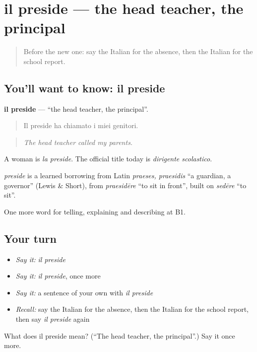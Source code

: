 \section[il preside]{il preside — the head teacher, the principal}

\label{lesson:IT-C379-preside}



\begin{quote}
Before the new one: say the Italian for the absence, then the Italian for the school report.
\end{quote}

\subsection*{You'll want to know: il preside}
\textbf{il preside} — \textquotedblleft{}the head teacher, the principal\textquotedblright{}.

\begin{quote}
Il preside ha chiamato i miei genitori.
\end{quote}

\begin{quote}
\emph{The head teacher called my parents.}
\end{quote}

A woman is \emph{la preside}. The official title today is \emph{dirigente scolastico}.

\begin{cousinweb}
\emph{preside} is a learned borrowing from Latin \emph{praeses, praesidis} \textquotedblleft{}a guardian, a governor\textquotedblright{} (Lewis \& Short), from \emph{praesidēre} \textquotedblleft{}to sit in front\textquotedblright{}, built on \emph{sedēre} \textquotedblleft{}to sit\textquotedblright{}.
\end{cousinweb}

\begin{grammarlens}[title={What you've built}]
One more word for telling, explaining and describing at B1.
\end{grammarlens}

\subsection*{Your turn}
\begin{itemize}
\raggedright
  \item \emph{Say it:} \emph{il preside}
  \item \emph{Say it:} \emph{il preside}, once more
  \item \emph{Say it:} a sentence of your own with \emph{il preside}
  \item \emph{Recall:} say the Italian for the absence, then the Italian for the school report, then say \emph{il preside} again
\end{itemize}

\begin{tcolorbox}[breakable,colback=teal!4,colframe=teal!35!black,title={Before you move on}]
What does il preside mean? (\textquotedblleft{}The head teacher, the principal\textquotedblright{}.) Say it once more.
\end{tcolorbox}
